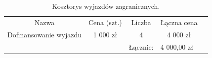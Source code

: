 \documentclass{article}
\begin{document}
\begin{table}[!htbp]
\centering
\caption*{Kosztorys wyjazdów zagranicznych.}
\begin{tabular}{lllll}
\cline{1-4}
\multicolumn{1}{|c|}{Nazwa}                     & \multicolumn{1}{c|}{Cena (szt.)} & \multicolumn{1}{c|}{Liczba} & \multicolumn{1}{c|}{Łączna cena} &  \\ \cline{1-4}
\multicolumn{1}{|c|}{Dofinansowanie wyjazdu} & \multicolumn{1}{c|}{1 000 zł}    
 & \multicolumn{1}{c|}{4}      & \multicolumn{1}{c|}{4 000 zł}     &  \\ 
\cline{1-4}
                                                &                                
  & Łącznie:                    & 4 000,00 zł                          & 
\end{tabular}
\end{table}


 

\end{document}

